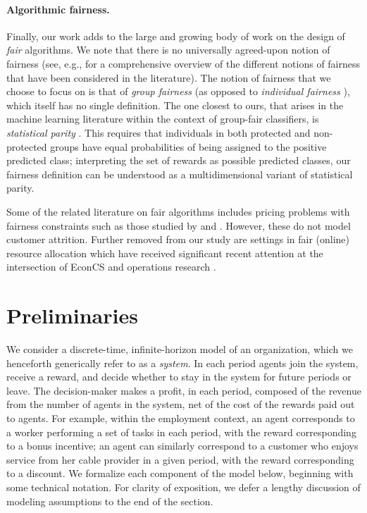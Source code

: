 \documentclass[12pt]{article}
\begin{document}
\paragraph{Algorithmic fairness.} Finally, our work adds to the large and growing body of work on the design of {\it fair} algorithms. We note that there is no universally agreed-upon notion of fairness (see, e.g., \cite{mehrabi2021survey} for a comprehensive overview of the different notions of fairness that have been considered in the literature). The notion of fairness that we choose to focus on is that of {\it group fairness} (as opposed to {\it individual fairness} \cite{dwork2012fairness}), which itself has no single definition. The one closest to ours, that arises in the machine learning literature within the context of group-fair classifiers, is {\it statistical parity} \cite{corbett2017algorithmic}. This requires that individuals in both  protected and non-protected groups have equal probabilities of being assigned to the positive predicted class; interpreting the set of rewards as possible predicted classes, our fairness definition can be understood as a multidimensional variant of statistical parity.

Some of the related literature on fair algorithms includes pricing problems with fairness constraints such as those studied by \cite{cohen2021dynamic,salem2021taming} and \cite{cohen2022price}. However, these do not model customer attrition. Further removed from our study are settings in fair (online) resource allocation which have received significant recent attention at the intersection of EconCS and operations research \cite{sinclair2021sequential,bateni2022fair,allouah2022robust, manshadi2021fair}. 
%
\section{Preliminaries}\label{sec:preliminaries}

We consider a discrete-time, infinite-horizon model of an organization{, which we henceforth generically refer to as a {\it system}}. {In each period {agents join the system, receive a reward, and decide whether to stay in the system for future periods or leave.} The {decision-maker} makes a profit, in each period, composed of the revenue from the {number of agents in the system}, net of {the cost of} the rewards {paid out to {agents}}. {For example, within the employment context, an agent corresponds to a worker performing a set of tasks in each period, with the reward corresponding to a bonus incentive; an agent can similarly correspond to a customer who enjoys service from her cable provider in a given period, with the reward corresponding to a discount.} We formalize each component of the model below}, {beginning with some technical notation.} {For clarity of exposition, we defer a lengthy discussion of modeling assumptions to the end of the section.}
\end{document}
